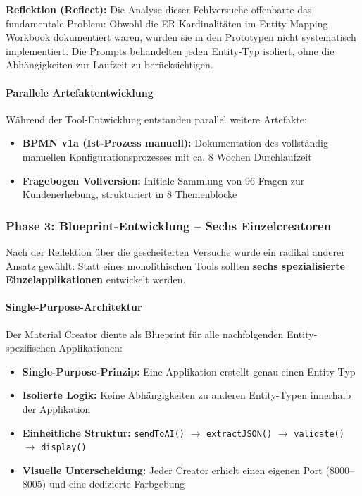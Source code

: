 \textbf{Reflektion (Reflect):} Die Analyse dieser Fehlversuche offenbarte das fundamentale Problem: Obwohl die ER-Kardinalitäten im Entity Mapping Workbook dokumentiert waren, wurden sie in den Prototypen nicht systematisch implementiert. Die Prompts behandelten jeden Entity-Typ isoliert, ohne die Abhängigkeiten zur Laufzeit zu berücksichtigen.

\paragraph{Parallele Artefaktentwicklung}

Während der Tool-Entwicklung entstanden parallel weitere Artefakte:

\begin{itemize}
    \item \textbf{BPMN v1a (Ist-Prozess manuell):} Dokumentation des vollständig manuellen Konfigurationsprozesses mit ca. 8 Wochen Durchlaufzeit
    \item \textbf{Fragebogen Vollversion:} Initiale Sammlung von 96 Fragen zur Kundenerhebung, strukturiert in 8 Themenblöcke
\end{itemize}


\subsubsection{Phase 3: Blueprint-Entwicklung -- Sechs Einzelcreatoren}
\label{subsubsec:Phase3}

Nach der Reflektion über die gescheiterten Versuche wurde ein radikal anderer Ansatz gewählt: Statt eines monolithischen Tools sollten \textbf{sechs spezialisierte Einzelapplikationen} entwickelt werden.

\paragraph{Single-Purpose-Architektur}

Der Material Creator diente als Blueprint für alle nachfolgenden Entity-spezifischen Applikationen:

\begin{itemize}
    \item \textbf{Single-Purpose-Prinzip:} Eine Applikation erstellt genau einen Entity-Typ
    \item \textbf{Isolierte Logik:} Keine Abhängigkeiten zu anderen Entity-Typen innerhalb der Applikation
    \item \textbf{Einheitliche Struktur:} \texttt{sendToAI()} $\rightarrow$ \texttt{extractJSON()} $\rightarrow$ \texttt{validate()} $\rightarrow$ \texttt{display()}
    \item \textbf{Visuelle Unterscheidung:} Jeder Creator erhielt einen eigenen Port (8000--8005) und eine dedizierte Farbgebung
\end{itemize}

